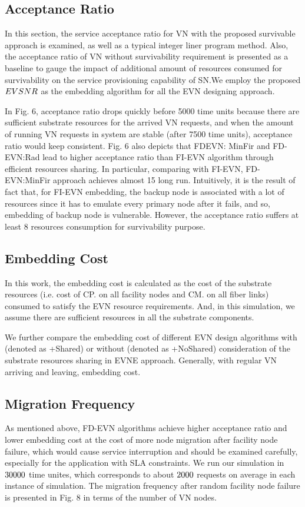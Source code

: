 \subsection{Acceptance Ratio}
In this section, the service acceptance ratio for VN with the proposed survivable approach is examined, as well as a typical integer liner program method. Also, the acceptance ratio of VN without survivability requirement is presented as a baseline to gauge the impact of additional amount of resources consumed for survivability on the service provisioning capability of SN.We employ the proposed $EVSNR$ as the embedding algorithm for all the EVN designing approach.

In Fig. 6, acceptance ratio drops quickly before 5000 time
units because there are sufficient substrate resources for the
arrived VN requests, and when the amount of running VN
requests in system are stable (after 7500 time units), acceptance
ratio would keep consistent. Fig. 6 also depicts that FDEVN:
MinFir and FD-EVN:Rad lead to higher acceptance ratio
than FI-EVN algorithm through efficient resources sharing. In
particular, comparing with FI-EVN, FD-EVN:MinFir approach achieves almost 15%
long run. Intuitively, it is the result of fact that, for FI-EVN embedding,
the backup node is associated with a lot of resources
since it has to emulate every primary node after it fails, and
so, embedding of backup node is vulnerable. However, the acceptance
ratio suffers at least 8%
resources consumption for survivability purpose.

\subsection{Embedding Cost}
In this work, the embedding cost is calculated as the cost of the substrate resources (i.e. cost of CP. on all facility nodes and CM. on all fiber links) consumed to satisfy the EVN resource requirements. And, in this simulation, we assume there are sufficient resources in all the substrate components.

We further compare the embedding cost of different EVN design
algorithms with (denoted as +Shared) or without (denoted as +NoShared) consideration of the substrate resources sharing in
EVNE approach. Generally, with regular VN arriving and leaving, embedding cost.

\subsection{Migration Frequency}
As mentioned above, FD-EVN algorithms achieve higher acceptance ratio and lower embedding cost at the cost of more node migration after facility node failure, which would cause service interruption and should be examined carefully, especially for the application with SLA constraints. We run our simulation in $30000$ time unites, which corresponds to about $2000$ requests on average in each instance of simulation. The migration frequency
after random facility node  failure is presented in Fig. 8 in terms of the number of VN nodes.



